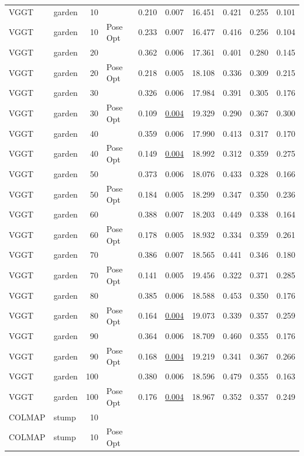 \begin{table}[H]
\begin{tabular}{llrlrrrrrr}
VGGT & garden & 10 &  & 0.210 & 0.007 & 16.451 & 0.421 & 0.255 & 0.101 \\
VGGT & garden & 10 & Pose Opt & 0.233 & 0.007 & 16.477 & 0.416 & 0.256 & 0.104 \\
VGGT & garden & 20 &  & 0.362 & 0.006 & 17.361 & 0.401 & 0.280 & 0.145 \\
VGGT & garden & 20 & Pose Opt & 0.218 & 0.005 & 18.108 & 0.336 & 0.309 & 0.215 \\
VGGT & garden & 30 &  & 0.326 & 0.006 & 17.984 & 0.391 & 0.305 & 0.176 \\
VGGT & garden & 30 & Pose Opt & 0.109 & \underline{0.004} & 19.329 & 0.290 & 0.367 & 0.300 \\
VGGT & garden & 40 &  & 0.359 & 0.006 & 17.990 & 0.413 & 0.317 & 0.170 \\
VGGT & garden & 40 & Pose Opt & 0.149 & \underline{0.004} & 18.992 & 0.312 & 0.359 & 0.275 \\
VGGT & garden & 50 &  & 0.373 & 0.006 & 18.076 & 0.433 & 0.328 & 0.166 \\
VGGT & garden & 50 & Pose Opt & 0.184 & 0.005 & 18.299 & 0.347 & 0.350 & 0.236 \\
VGGT & garden & 60 &  & 0.388 & 0.007 & 18.203 & 0.449 & 0.338 & 0.164 \\
VGGT & garden & 60 & Pose Opt & 0.178 & 0.005 & 18.932 & 0.334 & 0.359 & 0.261 \\
VGGT & garden & 70 &  & 0.386 & 0.007 & 18.565 & 0.441 & 0.346 & 0.180 \\
VGGT & garden & 70 & Pose Opt & 0.141 & 0.005 & 19.456 & 0.322 & 0.371 & 0.285 \\
VGGT & garden & 80 &  & 0.385 & 0.006 & 18.588 & 0.453 & 0.350 & 0.176 \\
VGGT & garden & 80 & Pose Opt & 0.164 & \underline{0.004} & 19.073 & 0.339 & 0.357 & 0.259 \\
VGGT & garden & 90 &  & 0.364 & 0.006 & 18.709 & 0.460 & 0.355 & 0.176 \\
VGGT & garden & 90 & Pose Opt & 0.168 & \underline{0.004} & 19.219 & 0.341 & 0.367 & 0.266 \\
VGGT & garden & 100 &  & 0.380 & 0.006 & 18.596 & 0.479 & 0.355 & 0.163 \\
VGGT & garden & 100 & Pose Opt & 0.176 & \underline{0.004} & 18.967 & 0.352 & 0.357 & 0.249 \\
\midrule
COLMAP & stump & 10 &  &  &  &  &  &  &  \\
COLMAP & stump & 10 & Pose Opt &  &  &  &  &  &  \\

\end{tabular}
\end{table}
